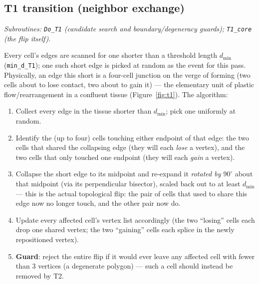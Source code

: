 \documentclass[11pt]{article}
\begin{document}
\subsection{T1 transition (neighbor exchange)}
\textit{Subroutines: \texttt{Do\_T1} (candidate search and boundary/degeneracy
guards); \texttt{T1\_core} (the flip itself).}

Every cell's edges are scanned for one shorter than a threshold length
$d_{\min}$ (\texttt{min\_d\_T1}); one such short edge is picked at random as the
event for this pass. Physically, an edge this short is a four-cell junction on the
verge of forming (two cells about to lose contact, two about to gain it) --- the
elementary unit of plastic flow/rearrangement in a confluent tissue (Figure~\ref{fig:t1}).
The algorithm:
\begin{enumerate}[label=(\arabic*)]
  \item Collect every edge in the tissue shorter than $d_{\min}$; pick one uniformly at
  random.
  \item Identify the (up to four) cells touching either endpoint of that edge: the two
  cells that shared the collapsing edge (they will each \emph{lose} a vertex), and the
  two cells that only touched one endpoint (they will each \emph{gain} a vertex).
  \item Collapse the short edge to its midpoint and re-expand it \emph{rotated by
  $90^\circ$} about that midpoint (via its perpendicular bisector), scaled back out to
  at least $d_{\min}$ --- this is the actual topological flip: the pair of cells that
  used to share this edge now no longer touch, and the other pair now do.
  \item Update every affected cell's vertex list accordingly (the two ``losing'' cells
  each drop one shared vertex; the two ``gaining'' cells each splice in the newly
  repositioned vertex).
  \item \textbf{Guard}: reject the entire flip if it would ever leave any affected cell
  with fewer than 3 vertices (a degenerate polygon) --- such a cell should instead be
  removed by T2.
\end{enumerate}
\end{document}
